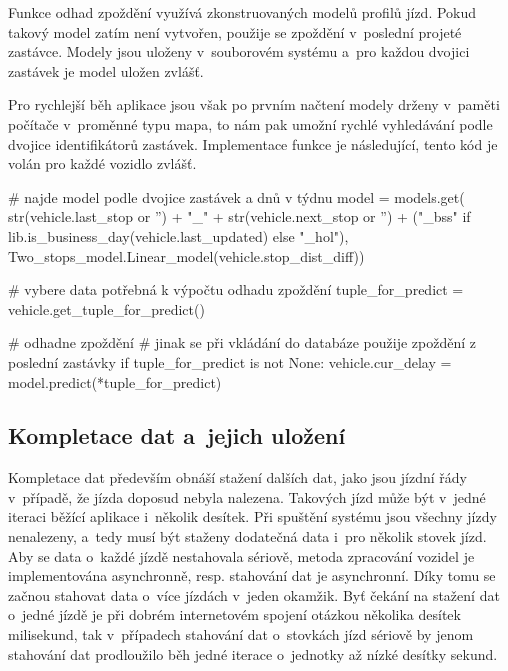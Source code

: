 \bigbreak


Funkce odhad zpoždění využívá zkonstruovaných modelů profilů jízd. Pokud takový model zatím není vytvořen, použije se zpoždění v~poslední projeté zastávce. Modely jsou uloženy v~souborovém systému a~pro každou dvojici zastávek je model uložen zvlášť.


\bigbreak


Pro rychlejší běh aplikace jsou však po prvním načtení modely drženy v~paměti počítače v~proměnné typu mapa, to nám pak umožní rychlé vyhledávání podle dvojice identifikátorů zastávek. Implementace funkce je následující, tento kód je volán pro každé vozidlo zvlášť.


\begin{code}[frame=none]
# najde model podle dvojice zastávek a dnů v týdnu
model = models.get(
  str(vehicle.last_stop or '') + "_" +
  str(vehicle.next_stop or '') +
  ("_bss" if lib.is_business_day(vehicle.last_updated) else "_hol"),
  Two_stops_model.Linear_model(vehicle.stop_dist_diff))


# vybere data potřebná k výpočtu odhadu zpoždění
tuple_for_predict = vehicle.get_tuple_for_predict()


# odhadne zpoždění
# jinak se při vkládání do databáze použije zpoždění z poslední zastávky
if tuple_for_predict is not None:
  vehicle.cur_delay = model.predict(*tuple_for_predict)
\end{code}


\subsection{Kompletace dat a~jejich uložení}

Kompletace dat především obnáší stažení dalších dat, jako jsou jízdní řády v~případě, že jízda doposud nebyla nalezena. Takových jízd může být v~jedné iteraci běžící aplikace i~několik desítek. Při spuštění systému jsou všechny jízdy nenalezeny, a~tedy musí být staženy dodatečná data i~pro několik stovek jízd. Aby se data o~každé jízdě nestahovala sériově, metoda zpracování vozidel je implementována asynchronně, resp. stahování dat je asynchronní. Díky tomu se začnou stahovat data o~více jízdách v~jeden okamžik. Byť čekání na stažení dat o~jedné jízdě je při dobrém internetovém spojení otázkou několika desítek milisekund, tak v~případech stahování dat o~stovkách jízd sériově by jenom stahování dat prodloužilo běh jedné iterace o~jednotky až nízké desítky sekund.


\bigbreak

